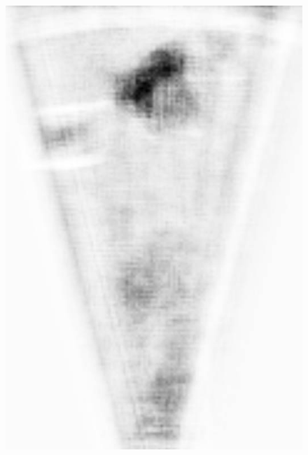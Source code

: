\begin{figure}[!t]
{        \includegraphics[height=0.2\textheight]{chapters/images/proposals/unseen/rotating-platform-fcn.jpg}
    }
    

\end{figure}
